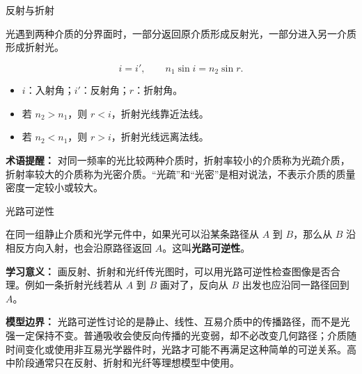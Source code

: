 \begin{conceptbox}{反射与折射}

光遇到两种介质的分界面时，一部分返回原介质形成反射光，一部分进入另一介质形成折射光。

\[
\boxed{i=i'},\qquad
\boxed{n_1\sin i=n_2\sin r}.
\]

\begin{center}


\label{fig:reflection-refraction}
\end{center}

\begin{itemize}
  \item $i$：入射角；$i'$：反射角；$r$：折射角。
  \item 若 $n_2>n_1$，则 $r<i$，折射光线靠近法线。
  \item 若 $n_2<n_1$，则 $r>i$，折射光线远离法线。
\end{itemize}

\textbf{术语提醒：} 对同一频率的光比较两种介质时，折射率较小的介质称为光疏介质，折射率较大的介质称为光密介质。“光疏”和“光密”是相对说法，不表示介质的质量密度一定较小或较大。

\end{conceptbox}

\begin{conceptbox}{光路可逆性}

在同一组静止介质和光学元件中，如果光可以沿某条路径从 $A$ 到 $B$，那么从 $B$ 沿相反方向入射，也会沿原路径返回 $A$。这叫\textbf{光路可逆性}。

\begin{center}


\label{fig:optical-reversibility}
\end{center}

\textbf{学习意义：} 画反射、折射和光纤传光图时，可以用光路可逆性检查图像是否合理。例如一条折射光线若从 $A$ 到 $B$ 画对了，反向从 $B$ 出发也应沿同一路径回到 $A$。

\textbf{模型边界：} 光路可逆性讨论的是静止、线性、互易介质中的传播路径，而不是光强一定保持不变。普通吸收会使反向传播的光变弱，却不必改变几何路径；介质随时间变化或使用非互易光学器件时，光路才可能不再满足这种简单的可逆关系。高中阶段通常只在反射、折射和光纤等理想模型中使用。

\end{conceptbox}

